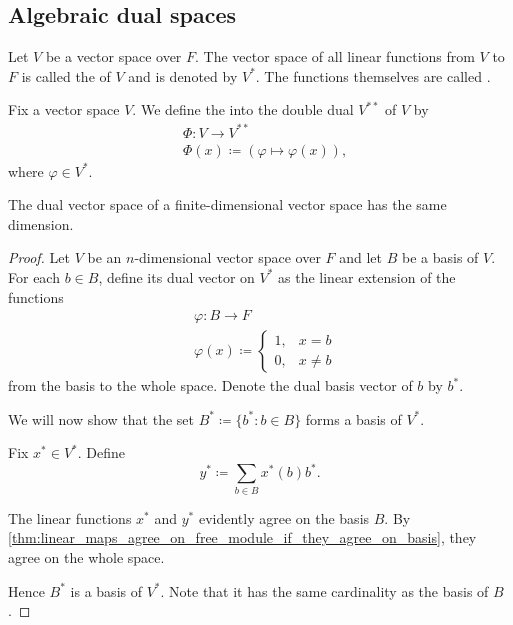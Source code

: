 \subsection{Algebraic dual spaces}\label{subsec:algebraic_dual_spaces}

\begin{definition}\label{def:dual_space}
  Let \( V \) be a vector space over \( F \). The vector space of all linear functions from \( V \) to \( F \) is called the  of \( V \) and is denoted by \( V^* \). The functions themselves are called .
\end{definition}

\begin{definition}\label{def:double_dual_canonical_embedding}
  Fix a vector space \( V \). We define the  into the double dual \( V^{**} \) of \( V \) by
  \begin{align*}
    &\Phi: V \to V^{**} \\
    &\Phi(x) \coloneqq (\varphi \mapsto \varphi(x)),
  \end{align*}
  where \( \varphi \in V^* \).
\end{definition}

\begin{proposition}\label{thm:finite_dimensional_dual_space_is_isomorphic}
  The dual vector space of a finite-dimensional vector space has the same dimension.
\end{proposition}
\begin{proof}
  Let \( V \) be an \( n \)-dimensional vector space over \( F \) and let \( B \) be a basis of \( V \). For each \( b \in B \), define its dual vector on \( V^* \) as the linear extension of the functions
  \begin{align*}
    &\varphi: B \to F \\
    &\varphi(x) \coloneqq \begin{cases}
      1, &x = b \\
      0, &x \neq b
    \end{cases}
  \end{align*}
  from the basis to the whole space. Denote the dual basis vector of \( b \) by \( b^* \).

  We will now show that the set \( B^* \coloneqq \{ b^* \colon b \in B \} \) forms a basis of \( V^* \).

  Fix \( x^* \in V^* \). Define
  \begin{equation*}
    y^* \coloneqq \sum_{b \in B} x^*(b) b^*.
  \end{equation*}

  The linear functions \( x^* \) and \( y^* \) evidently agree on the basis \( B \). By \cref{thm:linear_maps_agree_on_free_module_if_they_agree_on_basis}, they agree on the whole space.

  Hence \( B^* \) is a basis of \( V^* \). Note that it has the same cardinality as the basis of \( B \).
\end{proof}

